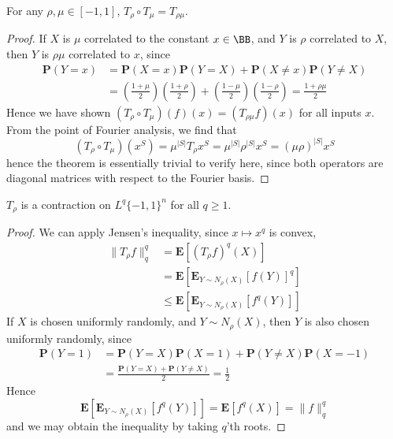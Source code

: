 \begin{theorem}
    For any $\rho, \mu \in [-1,1]$, $T_\rho \circ T_\mu = T_{\rho \mu}$.
\end{theorem}
\begin{proof}
    If $X$ is $\mu$ correlated to the constant $x \in \BB$, and $Y$ is $\rho$ correlated to $X$, then $Y$ is $\rho \mu$ correlated to $x$, since
    \begin{align*}
        \mathbf{P}(Y = x) &= \mathbf{P}(X = x) \mathbf{P}(Y = X) + \mathbf{P}(X \neq x) \mathbf{P}(Y \neq X)\\
        &= \left( \frac{1 + \mu}{2} \right) \left( \frac{1 + \rho}{2} \right) + \left( \frac{1 - \mu}{2} \right) \left( \frac{1 - \rho}{2} \right) = \frac{1 + \rho \mu}{2}
    \end{align*}
    Hence we have shown $(T_\rho \circ T_\mu)(f)(x) = (T_{\rho \mu} f)(x)$ for all inputs $x$. From the point of Fourier analysis, we find that
    \[ (T_\rho \circ T_\mu)(x^S) = \mu^{|S|} T_\rho x^S = \mu^{|S|} \rho^{|S|} x^S = (\mu \rho)^{|S|} x^S \]
    hence the theorem is essentially trivial to verify here, since both operators are diagonal matrices with respect to the Fourier basis.
\end{proof}

\begin{theorem}
    $T_\rho$ is a contraction on $L^q \{ -1,1 \}^n$ for all $q \geq 1$.
\end{theorem}
\begin{proof}
We can apply Jensen's inequality, since $x \mapsto x^q$ is convex,
%
\begin{align*}
    \| T_\rho f \|^q_q &= \mathbf{E}[(T_\rho f)^q(X)]\\
    &= \mathbf{E}[\mathbf{E}_{Y \sim N_\rho(X)}[f(Y)]^q]\\
    &\leq \mathbf{E}[\mathbf{E}_{Y \sim N_\rho(X)}[f^q(Y)]]
\end{align*}
%
If $X$ is chosen uniformly randomly, and $Y \sim N_\rho(X)$, then $Y$ is also chosen uniformly randomly, since
%
\begin{align*}
    \mathbf{P}(Y = 1) &= \mathbf{P}(Y = X) \mathbf{P}(X = 1) + \mathbf{P}(Y \neq X) \mathbf{P}(X = -1)\\
    &= \frac{\mathbf{P}(Y = X) + \mathbf{P}(Y \neq X)}{2} = \frac{1}{2}
\end{align*}
%
Hence
%
\[ \mathbf{E}[\mathbf{E}_{Y \sim N_\rho(X)}[f^q(Y)]] = \mathbf{E}[f^q(X)] = \| f \|_q^q \]
%
and we may obtain the inequality by taking $q$'th roots.
\end{proof}

